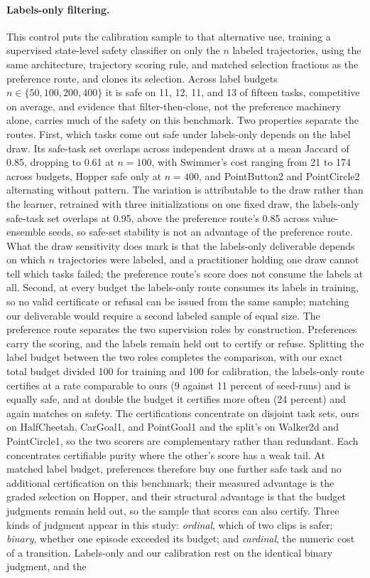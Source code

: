 \documentclass{article} %
\begin{document}
\paragraph{Labels-only filtering.} This control puts the calibration sample to that alternative use, training a supervised state-level safety classifier on only the $n$ labeled trajectories, using the same architecture, trajectory scoring rule, and matched selection fractions as the preference route, and clones its selection. Across label budgets $n \in \{50, 100, 200, 400\}$ it is safe on 11, 12, 11, and 13 of fifteen tasks, competitive on average, and evidence that filter-then-clone, not the preference machinery alone, carries much of the safety on this benchmark. Two properties separate the routes. First, which tasks come out safe under labels-only depends on the label draw. Its safe-task set overlaps across independent draws at a mean Jaccard of 0.85, dropping to 0.61 at $n = 100$, with Swimmer's cost ranging from 21 to 174 across budgets, Hopper safe only at $n = 400$, and PointButton2 and PointCircle2 alternating without pattern. The variation is attributable to the draw rather than the learner, retrained with three initializations on one fixed draw, the labels-only safe-task set overlaps at 0.95, above the preference route's 0.85 across value-ensemble seeds, so safe-set stability is not an advantage of the preference route. What the draw sensitivity does mark is that the labels-only deliverable depends on which $n$ trajectories were labeled, and a practitioner holding one draw cannot tell which tasks failed; the preference route's score does not consume the labels at all. Second, at every budget the labels-only route consumes its labels in training, so no valid certificate or refusal can be issued from the same sample; matching our deliverable would require a second labeled sample of equal size. The preference route separates the two supervision roles by construction. Preferences carry the scoring, and the labels remain held out to certify or refuse. Splitting the label budget between the two roles completes the comparison, with our exact total budget divided 100 for training and 100 for calibration, the labels-only route certifies at a rate comparable to ours (9 against 11 percent of seed-runs) and is equally safe, and at double the budget it certifies more often (24 percent) and again matches on safety. The certifications concentrate on disjoint task sets, ours on HalfCheetah, CarGoal1, and PointGoal1 and the split's on Walker2d and PointCircle1, so the two scorers are complementary rather than redundant. Each concentrates certifiable purity where the other's score has a weak tail. At matched label budget, preferences therefore buy one further safe task and no additional certification on this benchmark; their measured advantage is the graded selection on Hopper, and their structural advantage is that the budget judgments remain held out, so the sample that scores can also certify. Three kinds of judgment appear in this study: \emph{ordinal}, which of two clips is safer; \emph{binary}, whether one episode exceeded its budget; and \emph{cardinal}, the numeric cost of a transition. Labels-only and our calibration rest on the identical binary judgment, and the 
\end{document}

